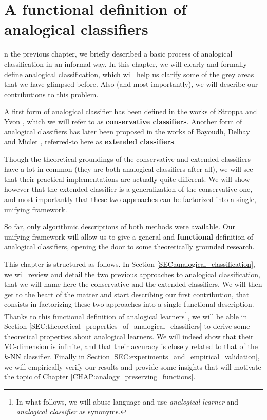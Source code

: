 \chapter{A functional definition of analogical classifiers}
\label{CHAP:functional_definition}
\localtableofcontents*
\vspace*{\baselineskip}

n the previous chapter, we
briefly described a basic process of analogical classification in an informal
way. In this chapter, we will clearly and formally define analogical
classification, which will help us clarify some of the grey areas that we have
glimpsed before. Also (and most
importantly), we will describe our contributions to this problem.

A first form of analogical classifier has been defined in the works of Stroppa
and Yvon \cite{StrYvoCNLL05}, which we will refer to as \textbf{conservative
classifiers}. Another form of analogical classifiers has later been proposed in
the works of Bayoudh, Delhay and Miclet \cite{MicBayDelJAIR08,
BayMicDelIJCAI07}, referred-to here as \textbf{extended classifiers}.

Though the theoretical groundings of the conservative and extended
classifiers have a lot in common (they are both analogical classifiers after
all), we will see that their practical implementations are actually quite
different. We will show however that the extended classifier is a
generalization of the conservative one, and most importantly that these two
approaches can be factorized into a single, unifying framework.

So far, only algorithmic descriptions of both methods were available. Our
unifying framework will allow us to give a general and \textbf{functional}
definition of analogical classifiers, opening the door to some theoretically
grounded research.

This chapter is structured as follows. In Section
\ref{SEC:analogical_classification}, we will review and detail the two previous
approaches to analogical classification, that we will name here the
conservative and the extended classifiers. We will then get to the heart of the
matter and start describing our first contribution, that consists in
factorizing these two approaches into a single functional description. Thanks to
this functional definition of analogical learners\footnote{In what follows, we
will abuse language and use \textit{analogical learner} and
\textit{analogical classifier} as synonyms.}, we will be able in Section
\ref{SEC:theoretical_properties_of_analogical_classifiers} to derive some
theoretical properties about analogical learners. We will indeed show that
their VC-dimension is infinite, and that their accuracy is closely related to
that of the $k$-NN classifier. Finally in Section
\ref{SEC:experiments_and_empirical_validation}, we will empirically verify our
results and provide some insights that will motivate the topic of Chapter
\ref{CHAP:analogy_preserving_functions}.

